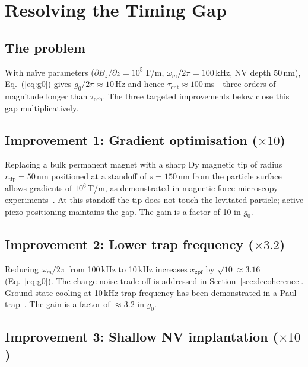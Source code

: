 \documentclass[12pt,a4paper]{article}
\begin{document}
\section{Resolving the Timing Gap}
\label{sec:timing}

\subsection{The problem}

With na\"ive parameters ($\partial B_z/\partial z = 10^5$\,T/m,
$\omega_m/2\pi = 100$\,kHz, NV depth 50\,nm), Eq.~(\ref{eq:g0}) gives
$g_0/2\pi \approx 10$\,Hz and hence $\tau_{\mathrm{ent}} \approx 100$\,ms---three
orders of magnitude longer than $\tau_{\mathrm{coh}}$. The three targeted
improvements below close this gap multiplicatively.

\subsection{Improvement 1: Gradient optimisation ($\times 10$)}

Replacing a bulk permanent magnet with a sharp Dy magnetic tip of radius
$r_{\mathrm{tip}} = 50$\,nm positioned at a standoff of $s = 150$\,nm from the
particle surface allows gradients of $10^6$\,T/m, as demonstrated in
magnetic-force microscopy experiments~\cite{Rugar2004}. At this standoff the
tip does not touch the levitated particle; active piezo-positioning maintains
the gap. The gain is a factor of 10 in $g_0$.

\subsection{Improvement 2: Lower trap frequency ($\times 3.2$)}

Reducing $\omega_m/2\pi$ from 100\,kHz to 10\,kHz increases $x_{\mathrm{zpf}}$
by $\sqrt{10} \approx 3.16$ (Eq.~\ref{eq:g0}). The charge-noise trade-off is
addressed in Section~\ref{sec:decoherence}. Ground-state cooling at 10\,kHz
trap frequency has been demonstrated in a Paul trap~\cite{Dania2021}. The gain
is a factor of $\approx 3.2$ in $g_0$.

\subsection{Improvement 3: Shallow NV implantation ($\times 10$)}
\end{document}

